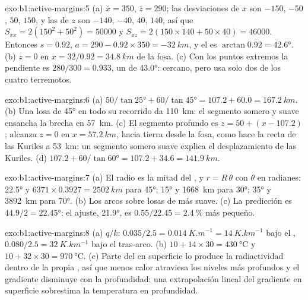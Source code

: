 \begin{solution}{exo:b1:active-margins:5}
(a) $\bar x = 350$, $\bar z = 290$; las desviaciones de $x$ son $-150$, $-50$,
$50$, $150$, y las de $z$ son $-140$, $-40$, $40$, $140$, así que
$S_{xx} = 2(150^2 + 50^2) = \num{50000}$ y
$S_{xz} = 2(150\times140 + 50\times40) = \num{46000}$. Entonces $s = 0.92$,
$a = 290 - 0.92\times350 = \qty{-32}{km}$, y el  es
$\arctan 0.92 = \ang{42.6}$. (b) $z = 0$ en $x = 32/0.92 = \qty{34.8}{km}$
de la fosa. (c) Con los puntos extremos la pendiente es $280/300 = 0.933$, un
 de \ang{43.0}: cercano, pero usa solo dos de los cuatro terremotos.
\end{solution}

\begin{solution}{exo:b1:active-margins:6}
(a) $50/\tan\ang{25} + 60/\tan\ang{45} = 107.2 + 60.0 = \qty{167.2}{km}$.
(b) Una losa de \ang{45} en todo su recorrido da \qty{110}{km}: el segmento somero y suave ensancha la brecha en
\qty{57}{km}. (c) El segmento profundo es $z = 50 + (x - 107.2)$; alcanza $z = 0$ en $x = \qty{57.2}{km}$, hacia tierra desde
la fosa, como hace la recta de las Kuriles a \qty{53}{km}: un segmento somero suave explica el desplazamiento de las Kuriles. (d) $107.2 + 60/\tan\ang{60} = 107.2 + 34.6 =
\qty{141.9}{km}$.
\end{solution}

\begin{solution}{exo:b1:active-margins:7}
(a) El radio es la mitad del , y $r = R\,\theta$ con $\theta$ en radianes:
\ang{22.5} y $6371\times0.3927 = \qty{2502}{km}$ para \ang{45}; \ang{15} y
\qty{1668}{km} para \ang{30}; \ang{35} y \qty{3892}{km} para \ang{70}.
(b) Los arcos sobre losas de  más suave. (c) La predicción es
$44.9/2 = \ang{22.45}$; el ajuste, \ang{21.9}, es
$0.55/22.45 = \qty{2.4}{\percent}$ más pequeño.
\end{solution}

\begin{solution}{exo:b1:active-margins:8}
(a) $q/k$: $0.035/2.5 = \qty{0.014}{K.m^{-1}} = \qty{14}{K.km^{-1}}$ bajo
el , $0.080/2.5 = \qty{32}{K.km^{-1}}$ bajo el tras-arco.
(b) $10 + 14\times30 = \qty{430}{\celsius}$ y
$10 + 32\times30 = \qty{970}{\celsius}$. (c) Parte del  en superficie
lo produce la radiactividad dentro de la propia , así que menos calor atraviesa
los niveles más profundos y el gradiente disminuye con la profundidad: una extrapolación lineal del
gradiente en superficie sobrestima la temperatura en profundidad.
\end{solution}

